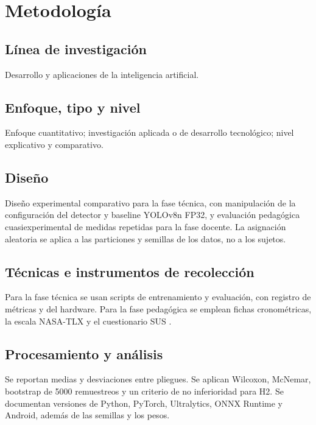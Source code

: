 \section{Metodología}

\subsection{Línea de investigación}
Desarrollo y aplicaciones de la inteligencia artificial.

\subsection{Enfoque, tipo y nivel}
Enfoque cuantitativo; investigación aplicada o de desarrollo tecnológico; nivel
explicativo y comparativo.

\subsection{Diseño}
Diseño experimental comparativo para la fase técnica, con manipulación de la
configuración del detector y baseline YOLOv8n FP32, y evaluación pedagógica
cuasiexperimental de medidas repetidas para la fase docente. La asignación
aleatoria se aplica a las particiones y semillas de los datos, no a los sujetos.

\subsection{Técnicas e instrumentos de recolección}
Para la fase técnica se usan scripts de entrenamiento y evaluación, con registro
de métricas y del hardware. Para la fase pedagógica se emplean fichas
cronométricas, la escala NASA-TLX \parencite{hart1988} y el cuestionario SUS
\parencite{brooke1996}.

\subsection{Procesamiento y análisis}
Se reportan medias y desviaciones entre pliegues. Se aplican Wilcoxon, McNemar,
bootstrap de 5000 remuestreos y un criterio de no inferioridad para H2. Se
documentan versiones de Python, PyTorch, Ultralytics, ONNX Runtime y Android,
además de las semillas y los pesos.
